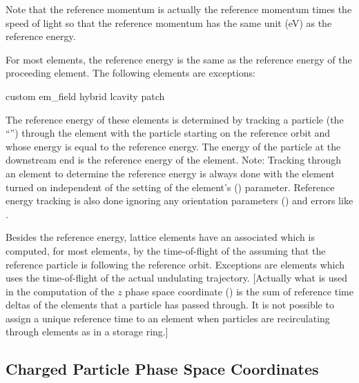 Note that the reference momentum  is actually the reference momentum times the speed of light
so that the reference momentum has the same unit (eV) as the reference energy.

For most elements, the reference energy is the same as the reference energy of the proceeding
element. The following elements are exceptions:
\begin{example}
  custom
  em_field
  hybrid
  lcavity
  patch
\end{example}
The reference energy of these elements is determined by tracking a particle (the ``'') through the element with the particle starting on the reference orbit and whose energy
is equal to the reference energy. The energy of the particle at the downstream end is the reference
energy of the element. Note: Tracking through an element to determine the reference energy is always
done with the element turned on independent of the setting of the element's 
() parameter. Reference energy tracking is also done ignoring any orientation parameters
() and errors like .

Besides the reference energy, lattice elements have an associated  which is
computed, for most elements, by the time-of-flight of the  assuming that the
reference particle is following the reference orbit. Exceptions are  elements which uses
the time-of-flight of the actual undulating trajectory. [Actually what is used in the computation of
the $z$ phase space coordinate () is the sum of reference time deltas of the elements that
a particle has passed through. It is not possible to assign a unique reference time to an element
when particles are recirculating through elements as in a storage ring.]

\subsection{Charged Particle Phase Space Coordinates}
\label{s:phase.space}

